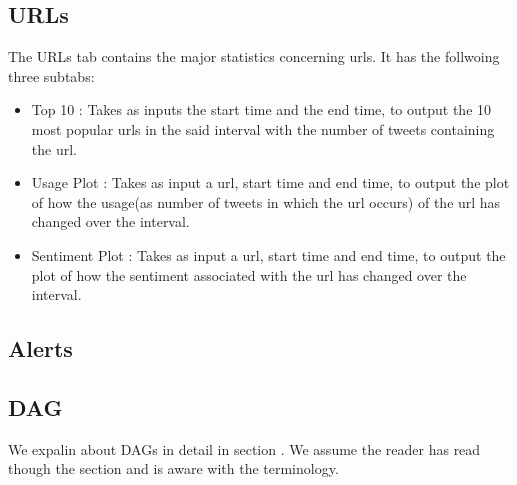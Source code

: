 \documentclass[letterpaper,10pt,english]{sphinxmanual}
\begin{document}
\subsection{URLs}
\label{\detokenize{dashboard_website:urls}}
The URLs tab contains the major statistics concerning urls. It has the follwoing three subtabs:
\begin{itemize}
\item {} 
Top 10 : Takes as inputs the start time and the end time, to output the 10 most popular urls in the said interval with the number of tweets containing the url.

\item {} 
Usage Plot : Takes as input a url, start time and end time, to output the plot of how the usage(as number of tweets in which the url occurs) of the url has changed over the interval.

\item {} 
Sentiment Plot : Takes as input a url, start time and end time, to output the plot of how the sentiment associated with the url has changed over the interval.

\end{itemize}


\subsection{Alerts}
\label{\detokenize{dashboard_website:alerts}}

\subsection{DAG}
\label{\detokenize{dashboard_website:dag}}
We expalin about DAGs in detail in section {\hyperref[\detokenize{dag:composing-multiple-queries-dag}]{}}. We assume the reader has read though the section and is aware with the terminology.
\end{document}
